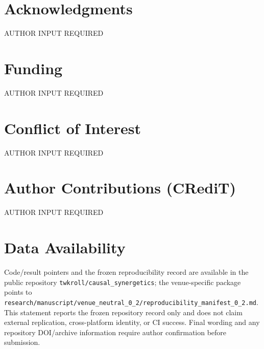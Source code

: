 \section*{Acknowledgments}
AUTHOR INPUT REQUIRED

\section*{Funding}
AUTHOR INPUT REQUIRED

\section*{Conflict of Interest}
AUTHOR INPUT REQUIRED

\section*{Author Contributions (CRediT)}
AUTHOR INPUT REQUIRED

\section*{Data Availability}
Code/result pointers and the frozen reproducibility record are available in the public repository \texttt{twkroll/causal\_synergetics}; the venue-specific package points to \texttt{research/manuscript/venue\_neutral\_0\_2/reproducibility\_manifest\_0\_2.md}. This statement reports the frozen repository record only and does not claim external replication, cross-platform identity, or CI success. Final wording and any repository DOI/archive information require author confirmation before submission.





